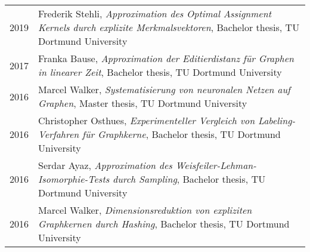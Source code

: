\documentclass[11pt, a4paper, DIV=14, headings=small]{scrartcl}
\begin{document}
\begin{longtabu}{p{2.1cm}p{12.0cm}}
		2019 & Frederik Stehli, \emph{Approximation des Optimal Assignment Kernels durch explizite Merkmalsvektoren}, Bachelor thesis, TU Dortmund University                                                       \\
		2017 & Franka Bause, \emph{Approximation der Editierdistanz für Graphen in linearer Zeit}, Bachelor thesis, TU Dortmund University                                                                          \\
		2016 & Marcel Walker, \emph{Systematisierung von neuronalen Netzen auf Graphen}, Master thesis, TU Dortmund University                                                                                      \\
		2016 & Christopher Osthues, \emph{Experimenteller Vergleich von Labeling-Verfahren für Graphkerne}, Bachelor thesis, TU Dortmund University                                                                 \\
		2016 & Serdar Ayaz, \emph{Approximation des Weisfeiler-Lehman-Isomorphie-Tests durch Sampling}, Bachelor thesis, TU Dortmund University                                                                     \\
		2016 & Marcel Walker, \emph{Dimensionsreduktion von expliziten Graphkernen durch Hashing}, Bachelor thesis, TU Dortmund University                                                                          \\
	\end{longtabu}
	
	
\end{document}
